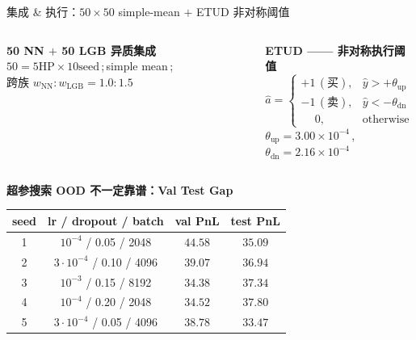 \documentclass[aspectratio=169,11pt]{beamer}
\newcommand{\hl}[1]{\textcolor{lblue}{\textbf{#1}}}
\begin{document}
\begin{frame}{集成 \& 执行：$50\!\times\!50$ simple-mean $+$ ETUD 非对称阈值}
  \vspace{-2pt}
  \begin{columns}[T,onlytextwidth]
    \begin{block}{\hl{50 NN $+$ 50 LGB 异质集成}}
      \footnotesize
      $50 = 5\text{HP} \times 10\text{seed}$\,;\,simple mean\,;\,\\跨族 \hl{$w_{\mathrm{NN}}:w_{\mathrm{LGB}} = 1.0 : 1.5$}
    \end{block}

    \begin{block}{\hl{ETUD —— 非对称执行阈值}}
      \footnotesize
      \vspace{-4pt}
      \[
      \hat a =
      \begin{cases}
        +1\,(\text{买}), & \hat y > +\theta_{\mathrm{up}}\\
        -1\,(\text{卖}), & \hat y < -\theta_{\mathrm{dn}}\\
        \phantom{+}0, & \text{otherwise}
      \end{cases}
      \]
      \vspace{-2pt}
      \hl{$\theta_{\mathrm{up}}{=}3.00{\times}10^{-4}$}\,,\,\,\hl{$\theta_{\mathrm{dn}}{=}2.16{\times}10^{-4}$}
    \end{block}
  \end{columns}

  \vspace{2pt}
  \begin{columns}[T,onlytextwidth]
    \begin{center}\scriptsize
    \textbf{\color{icmlblue}超参搜索 OOD 不一定靠谱：Val Test Gap}\\[1pt]
    \setlength{\tabcolsep}{3pt}
    \begin{tabular}{@{}cccc@{}}
    \toprule
    seed & lr / dropout / batch & val PnL & test PnL \\
    \midrule
    1 & $10^{-4}$ / 0.05 / 2048 & \hl{$44.58$} & $35.09$ \\
    2 & $3{\cdot}10^{-4}$ / 0.10 / 4096 & $39.07$ & $36.94$ \\
    3 & $10^{-3}$ / 0.15 / 8192 & $34.38$ & $37.34$ \\
    4 & $10^{-4}$ / 0.20 / 2048 & $34.52$ & \hl{$37.80$} \\
    5 & $3{\cdot}10^{-4}$ / 0.05 / 4096 & $38.78$ & $33.47$ \\
    \bottomrule
    \end{tabular}
    \end{center}


\end{columns}
\end{frame}
\end{document}
